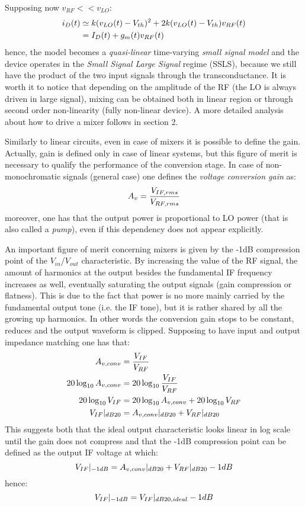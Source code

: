 Supposing now $v_{RF}<<v_{LO}$:
\begin{align}
i_D(t) &\simeq k(v_{LO}(t)-V_{th})^2+2k(v_{LO}(t)-V_{th})v_{RF}(t) \notag  \\
& = I_D(t)+g_m(t)v_{RF}(t) \notag
\end{align}
hence, the model becomes a \emph{quasi-linear} time-varying \emph{small signal model} and the device operates in the \emph{Small Signal Large Signal} regime (SSLS), because we still have the product of the two input signals through the transconductance. It is worth it to notice that depending on the amplitude of the RF (the LO is always driven in large signal), mixing can be obtained both in linear region or through second order non-linearity (fully non-linear device).
A more detailed analysis about how to drive a mixer follows in section 2.

Similarly to linear circuits, even in case of mixers it is possible to define the gain. Actually, gain is defined only in case of linear systems, but this figure of merit is necessary to qualify the performance of the conversion stage.
In case of non-monochromatic signals (general case) one defines the \emph{voltage conversion gain} as:
\begin{equation}
	A_v= \frac{V_{IF,rms}}{V_{RF,rms}} \notag
\end{equation}
moreover, one has that the output power is proportional to LO power (that is also called a \emph{pump}), even if this dependency does not appear explicitly.

An important figure of merit concerning mixers is given by the -1dB compression point of the $V_{in}$/$V_{out}$ characteristic. By increasing the value of the RF signal, the amount of harmonics at the output besides the fundamental IF frequency increases as well, eventually saturating the output signals (gain compression or flatness). This is due to the fact that power is no more mainly carried by the fundamental output tone (i.e. the IF tone), but it is rather shared by all the growing up harmonics. In other words the conversion gain stops to be constant, reduces and the output waveform is clipped. Supposing to have input and output impedance matching one has that:
\begin{align}
	A_{v,conv}&=\frac{V_{IF}}{V_{RF}} \notag \\
	20\log_{10}A_{v,conv} & = 20\log_{10}\frac{V_{IF}}{V_{RF}}  \notag \\
	20\log_{10}V_{IF} & = 20\log_{10}A_{v,conv} + 20\log_{10}V_{RF} \notag \\	V_{IF}|_{dB20} &= A_{v,conv}|_{dB20} + V_{RF}|_{dB20} \notag
\end{align}
This suggests both that the ideal output characteristic looks linear in log scale until the gain does not compress and that the -1dB compression point can be defined as the output IF voltage at which:
\begin{equation}
V_{IF}|_{-1dB} = A_{v,conv}|_{dB20} + V_{RF}|_{dB20} -1dB \notag
\end{equation}
hence:
\begin{equation}
V_{IF}|_{-1dB} = V_{IF}|_{dB20,ideal} -1dB \notag
\end{equation}

